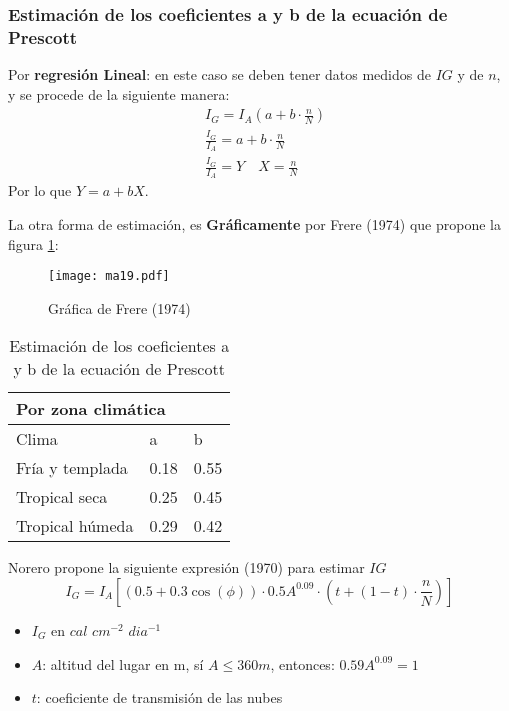 \subsubsection{Estimación de los coeficientes a y b de la ecuación de Prescott}
Por \textbf{regresión Lineal}: en este caso se deben tener datos medidos de $IG$ y de $n$, y se procede de la siguiente manera:
\begin{align*}
    &I_G = I_A\left(a + b \cdot \frac{n}{N} \right)\\
    &\frac{I_G}{I_A} = a + b\cdot \frac{n}{N}\\
    &\frac{I_G}{I_A} = Y\quad X = \frac{n}{N}
\end{align*}
Por lo que $Y = a + bX$.

La otra forma de estimación, es \textbf{Gráficamente} por Frere (1974) que propone la figura \ref{ma19}:
\begin{figure}[h!]
\centering
  \texttt{[image: ma19.pdf]}
  \caption{Gráfica de Frere (1974)}
  \label{ma19}
\end{figure}
\begin{table}[h!]
    \centering
    \begin{tabular}{@{}lll@{}}
        \toprule
        \multicolumn{3}{l}{Por zona climática} \\ \midrule
        Clima              & a       & b       \\
        Fría y templada    & 0.18    & 0.55    \\
        Tropical seca      & 0.25    & 0.45    \\
        Tropical húmeda    & 0.29    & 0.42    \\ \bottomrule
        \end{tabular}
    \caption{Estimación de los coeficientes a y b de la ecuación de Prescott}
    \label{tabma12}
\end{table}
Norero propone la siguiente expresión (1970) para estimar $IG$
\begin{equation}
    I_G = I_A\left[\left(0.5 + 0.3 \cos{(\phi)}\right)  \cdot 0.5A^{0.09}\cdot \left(t +(1 - t)\cdot \frac{n}{N}\right) \right]
\end{equation}
\begin{notation}
    \begin{itemize}
        \item $I_G$ en $cal$ $cm^{-2}$ $dia^{-1}$
        \item $A$: altitud del lugar en m, sí $A\leq 360 m$, entonces: $0.59A^{0.09}=1$
        \item $t$: coeficiente de transmisión de las nubes
    \end{itemize}
\end{notation}
